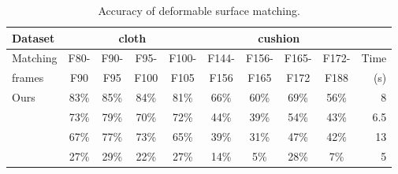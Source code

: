 \begin{table}[tb]
\centering
\tabcolsep=1pt
\setlength{\aboverulesep}{0pt}
\setlength{\belowrulesep}{0pt}
\caption{Accuracy of deformable surface matching.}
\hspace{-5ex}
\label{tab:errorrate1}
\small
\begin{tabular}{l|c c c c | c c c c | r}
\toprule
{Dataset}  & \multicolumn{4}{|c|}{ {cloth}} & \multicolumn{4}{c|}{ {cushion}} & \\
\hline
 {Matching} &  {F80-}	&  {F90-}	& {F95-}	& {F100-} & {F144-} & {F156-}	& {F165-}	& {F172-} &  {Time}  \\
 {frames}                &  {F90 }    &  {F95 }   & {F100}    & {F105}  & {F156}  & {F165}    & {F172}    & {F188}  &  {(s)} \\
\hline
 {Ours}   &  {83\%}    &  {85\%}	& {84\%} 	& {81\%}  & {66\%}	& {60\%}	& {69\%}	& {56\%}  &  {8}  \\
 {\cite{Zass08}}   & {73\%}	    & {79\%}	& {70\%}	& {72\%}  & {44\%}  & {39\%}    & {54\%}	& {43\%}   & {6.5}  \\
{\cite{Duchenne09,Duchenne2011}} & {67\%}    & {77\%}    & {73\%}	& {65\%}  & {39\%}	& {31\%}	& {47\%}	& {42\%}   & {13}  \\
 {\cite{Cour06}}   & {27\%}     & {29\%}	&  {22\%}	& {27\%}  & {14\%}  & {5\%}	    & {28\%}	& {7\%}    & {5}  \\
\bottomrule
\end{tabular}%
\end{table}%
